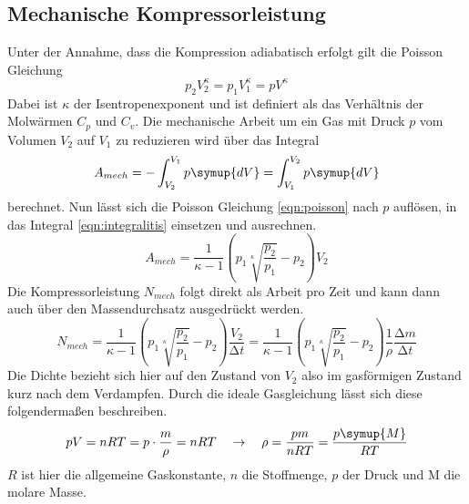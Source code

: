 \subsection{Mechanische Kompressorleistung}
Unter der Annahme, dass die Kompression adiabatisch erfolgt gilt die Poisson Gleichung
\begin{equation}
\label{eqn:poisson}
p_{2}V_{2}^{\kappa} = p_{1}V_{1}^{\kappa} = pV^{\kappa}
\end{equation}
Dabei ist $\kappa$ der Isentropenexponent und ist definiert als das Verhältnis der Molwärmen $C_{p}$ und $C_{v}$.
Die mechanische Arbeit um ein Gas mit Druck $p$ vom Volumen $V_{2}$ auf $V_{1}$ zu reduzieren wird über das Integral
\begin{equation}
\label{eqn:integralitis}
A_{mech} = - \int_{V_{2}}^{V_{1}} p \symup{dV} = \int_{V_{1}}^{V_{2}} p \symup{dV}
\end{equation}
berechnet. Nun lässt sich die Poisson Gleichung \eqref{eqn:poisson} nach $p$ auflösen, in das Integral \eqref{eqn:integralitis} einsetzen und ausrechnen.
\begin{equation}
A_{mech} = \frac{1}{\kappa - 1} \left( p_{1}\sqrt[\kappa]{\frac{p_{2}}{p_{1}}} - p_{2} \right) V_{2}
\end{equation}
Die Kompressorleistung $N_{mech}$ folgt direkt als Arbeit pro Zeit und kann dann auch über den Massendurchsatz ausgedrückt werden.
\begin{equation}
N_{mech} = \frac{1}{\kappa - 1} \left( p_{1}\sqrt[\kappa]{\frac{p_{2}}{p_{1}}} - p_{2} \right) \frac{V_{2}}{\increment t} = \frac{1}{\kappa - 1} \left( p_{1}\sqrt[\kappa]{\frac{p_{2}}{p_{1}}} - p_{2} \right) \frac{1}{\rho} \frac{\increment m}{\increment t}
\end{equation}
Die Dichte bezieht sich hier auf den Zustand von $V_{2}$ also im gasförmigen Zustand kurz nach dem Verdampfen. Durch die ideale Gasgleichung lässt sich diese folgendermaßen beschreiben.
\begin{equation}
\label{eqn:idealegasgl}
p V = nRT = p \cdot \frac{m}{\rho} = nRT \quad \to \quad \rho = \frac{pm}{nRT} = \frac{p \symup{M}}{RT}
\end{equation}
$R$ ist hier die allgemeine Gaskonstante, $n$ die Stoffmenge, $p$ der Druck und M die molare Masse.
